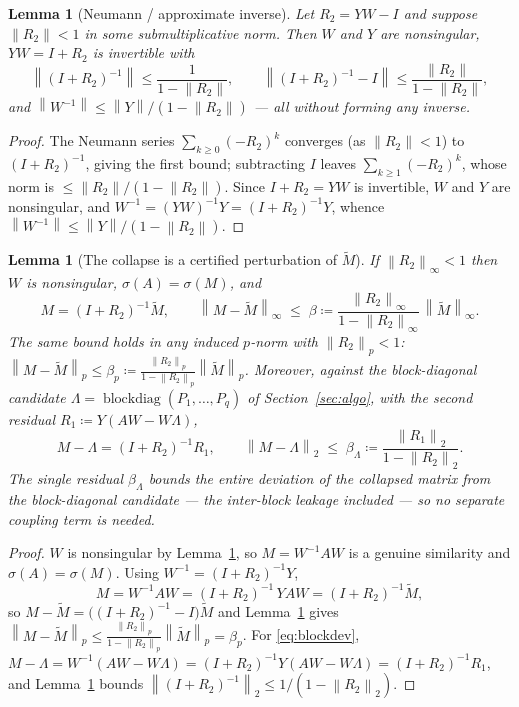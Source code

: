 \documentclass[11pt,a4paper]{article}
\newcommand{\norm}[1]{\left\|#1\right\|}
\newcommand{\spec}{\sigma}
\theoremstyle{plain}
\newtheorem{lemma}[theorem]{Lemma}
\theoremstyle{definition}
\begin{document}
\begin{lemma}[Neumann / approximate inverse]\label{lem:neumann}
Let $R_2=YW-I$ and suppose $\norm{R_2}<1$ in some submultiplicative norm. Then $W$ and
$Y$ are nonsingular, $YW=I+R_2$ is invertible with
\[
  \norm{(I+R_2)^{-1}}\le\frac{1}{1-\norm{R_2}},\qquad
  \norm{(I+R_2)^{-1}-I}\le\frac{\norm{R_2}}{1-\norm{R_2}},
\]
and $\norm{W^{-1}}\le \norm{Y}/(1-\norm{R_2})$ --- all without forming any inverse.
\end{lemma}

\begin{proof}
The Neumann series $\sum_{k\ge0}(-R_2)^k$ converges (as $\norm{R_2}<1$) to
$(I+R_2)^{-1}$, giving the first bound; subtracting $I$ leaves
$\sum_{k\ge1}(-R_2)^k$, whose norm is $\le\norm{R_2}/(1-\norm{R_2})$. Since
$I+R_2=YW$ is invertible, $W$ and $Y$ are nonsingular, and
$W^{-1}=(YW)^{-1}Y=(I+R_2)^{-1}Y$, whence $\norm{W^{-1}}\le\norm{Y}/(1-\norm{R_2})$.
\end{proof}

\begin{lemma}[The collapse is a certified perturbation of $\widetilde M$]\label{lem:deviation}
If $\norm{R_2}_\infty<1$ then $W$ is nonsingular, $\spec(A)=\spec(M)$, and
\[
  M=(I+R_2)^{-1}\widetilde M,\qquad
  \norm{M-\widetilde M}_\infty \;\le\; \beta \coloneqq
  \frac{\norm{R_2}_\infty}{1-\norm{R_2}_\infty}\,\norm{\widetilde M}_\infty .
\]
The same bound holds in any induced $p$-norm with $\norm{R_2}_p<1$:
$\norm{M-\widetilde M}_p\le\beta_p\coloneqq\frac{\norm{R_2}_p}{1-\norm{R_2}_p}\norm{\widetilde M}_p$.
Moreover, against the \emph{block-diagonal candidate}
$\Lambda=\operatorname{blockdiag}(P_1,\dots,P_q)$ of Section~\ref{sec:algo}, with the second
residual $R_1\coloneqq Y(AW-W\Lambda)$,
\begin{equation}\label{eq:blockdev}
  M-\Lambda=(I+R_2)^{-1}R_1,\qquad
  \norm{M-\Lambda}_2\;\le\;\beta_\Lambda\coloneqq\frac{\norm{R_1}_2}{1-\norm{R_2}_2}.
\end{equation}
The \emph{single} residual $\beta_\Lambda$ bounds the entire deviation of the collapsed
matrix from the block-diagonal candidate --- the inter-block leakage \emph{included} --- so
no separate coupling term is needed.
\end{lemma}

\begin{proof}
$W$ is nonsingular by Lemma~\ref{lem:neumann}, so $M=W^{-1}AW$ is a genuine
similarity and $\spec(A)=\spec(M)$. Using $W^{-1}=(I+R_2)^{-1}Y$,
\[
  M = W^{-1}AW = (I+R_2)^{-1}\,YAW = (I+R_2)^{-1}\widetilde M ,
\]
so $M-\widetilde M=\big((I+R_2)^{-1}-I\big)\widetilde M$ and Lemma~\ref{lem:neumann}
gives $\norm{M-\widetilde M}_p\le \frac{\norm{R_2}_p}{1-\norm{R_2}_p}\norm{\widetilde M}_p=\beta_p$.
For \eqref{eq:blockdev}, $M-\Lambda=W^{-1}(AW-W\Lambda)=(I+R_2)^{-1}Y(AW-W\Lambda)=(I+R_2)^{-1}R_1$,
and Lemma~\ref{lem:neumann} bounds $\norm{(I+R_2)^{-1}}_2\le 1/(1-\norm{R_2}_2)$.
\end{proof}
\end{document}
